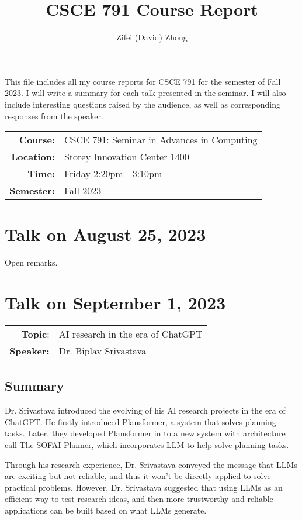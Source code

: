 \documentclass[11pt, oneside]{article}   	%
\title{CSCE 791 Course Report}
\author{Zifei (David) Zhong}
\begin{document}
\maketitle

This file includes all my course reports for CSCE 791 for the semester
of Fall 2023. I will write a summary for each talk presented in the
seminar. I will also include interesting questions raised by the
audience, as well as corresponding responses from the speaker.\\

\begin{center}
\begin{tabularx}{0.65\textwidth}{r X}
\textbf{Course:} & CSCE 791: Seminar in Advances in Computing\\
\textbf{Location:} & Storey Innovation Center 1400\\
\textbf{Time:} & Friday 2:20pm - 3:10pm\\
\textbf{Semester:} & Fall 2023
\end{tabularx}
\end{center}

\newpage
\section{Talk on August 25, 2023}
Open remarks.

\newpage
\section{Talk on September 1, 2023}
\begin{tabularx} {\textwidth}{r X}
\textbf{Topic}: & AI research in the era of ChatGPT \\
\textbf{Speaker:} & Dr. Biplav Srivastava \\
\end{tabularx}

\subsection{Summary}
Dr. Srivastava introduced the evolving of his AI research projects in the era of ChatGPT. He firstly introduced Plansformer, a system that solves planning tasks. Later, they developed Plansformer in to a new system with architecture call The SOFAI Planner, which incorporates LLM to help solve planning tasks.

Through his research experience, Dr. Srivastava conveyed the message that LLMs are exciting but not reliable, and thus it won't be directly applied to solve practical problems. However, Dr. Srivastava suggested that using LLMs as an efficient way to test research ideas, and then more trustworthy and reliable applications can be built based on what LLMs generate.
\end{document}
